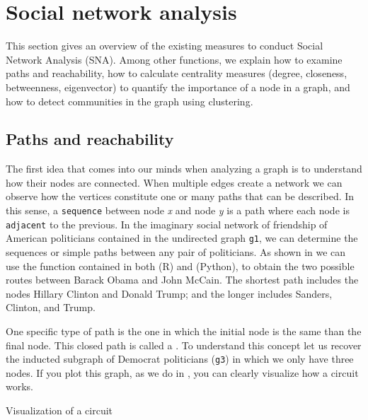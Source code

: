 \section{Social network analysis}
\label{sec:sna}

This section gives an overview of the existing measures to conduct Social Network Analysis (SNA). Among other functions, we explain how to examine paths and reachability, how to calculate centrality measures (degree, closeness, betweenness, eigenvector) to quantify the importance of a node in a graph, and how to detect communities in the graph using clustering.

\subsection{Paths and reachability}

The first idea that comes into our minds when analyzing a graph is to understand how their nodes are connected. When multiple edges create a network we can observe how the vertices constitute one or many paths that can be described. In this sense, a \texttt{sequence} between node \textit{x} and node \textit{y} is a path where each node is \texttt{adjacent} to the previous. In the imaginary social network of friendship of American politicians contained in the undirected graph \texttt{g1}, we can determine the sequences or simple paths between any pair of politicians. As shown in  we can use the function  contained in both  (R) and  (Python), to obtain the two possible routes between Barack Obama and John McCain. The shortest path includes the nodes Hillary Clinton and Donald Trump; and the longer includes Sanders, Clinton, and Trump.


One specific type of path is the one in which the initial node is the same than the final node. This closed path is called a . To understand this concept let us recover the inducted subgraph of Democrat politicians (\texttt{g3}) in which we only have three nodes. If you plot this graph, as we do in , you can clearly visualize how a circuit works. 

\begin{ccsexample}
  \caption{Visualization of a circuit}
  \label{ex:circuit}
\end{ccsexample}

